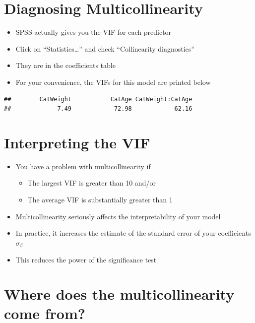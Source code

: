 \documentclass[]{article}
\providecommand{\tightlist}{%
  \setlength{\itemsep}{0pt}\setlength{\parskip}{0pt}}
\begin{document}
\section{Diagnosing
Multicollinearity}\label{diagnosing-multicollinearity}

\begin{itemize}
\tightlist
\item
  SPSS actually gives you the VIF for each predictor
\item
  Click on ``Statistics\ldots{}'' and check ``Collinearity diagnostics''
\item
  They are in the coefficients table
\item
  For your convenience, the VIFs for this model are printed below
\end{itemize}

\begin{verbatim}
##        CatWeight           CatAge CatWeight:CatAge 
##             7.49            72.98            62.16
\end{verbatim}

\section{Interpreting the VIF}\label{interpreting-the-vif}

\begin{itemize}
\tightlist
\item
  You have a problem with multicollinearity if

  \begin{itemize}
  \tightlist
  \item
    The largest VIF is greater than 10 and/or
  \item
    The average VIF is substantially greater than 1
  \end{itemize}
\item
  Multicollinearity seriously affects the interpretability of your model
\item
  In practice, it increases the estimate of the standard error of your
  coefficients \(\sigma_{\beta}\)
\item
  This reduces the power of the significance test
\end{itemize}

\section{Where does the multicollinearity come
from?}\label{where-does-the-multicollinearity-come-from}
\end{document}
